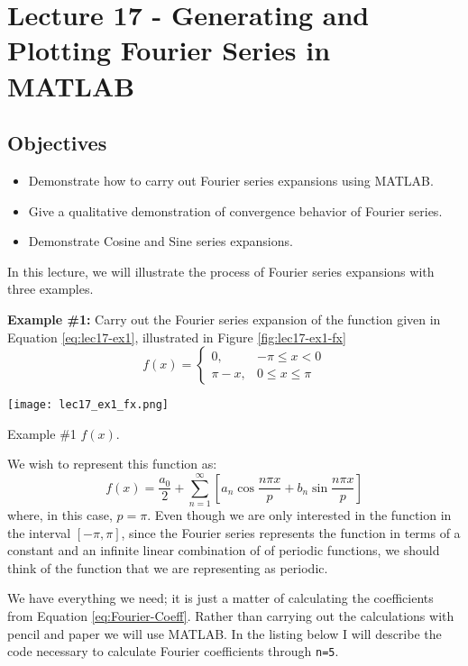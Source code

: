 \chapter{Lecture 17 - Generating and Plotting Fourier Series in MATLAB}
\label{ch:lec17}
\section{Objectives}
\begin{itemize}
\item Demonstrate how to carry out Fourier series expansions using MATLAB.
\item Give a qualitative demonstration of convergence behavior of Fourier series.
\item Demonstrate Cosine and Sine series expansions.
\end{itemize}
In this lecture, we will illustrate the process of Fourier series expansions with three examples.

\vspace{0.5cm}

\noindent\textbf{Example \#1:}
Carry out the Fourier series expansion of the function given in Equation \ref{eq:lec17-ex1}, illustrated in Figure \ref{fig:lec17-ex1-fx}
\begin{equation}
f(x) = 
\begin{cases}
0, & -\pi \le x < 0 \\
\pi - x, & 0 \le x \le \pi
\end{cases}
\label{eq:lec17-ex1}
\end{equation}
\begin{marginfigure}
\texttt{[image: lec17\_ex1\_fx.png]}
\caption{Example \#1 $f(x)$.}
\label{fig:lec17-ex1-fx}
\end{marginfigure}
We wish to represent this function as:
\begin{equation*}
f(x) = \frac{a_0}{2} + \sum\limits_{n=1}^{\infty} \left[a_n \cos{\frac{n \pi x}{p}} + b_n \sin{\frac{n \pi x}{p}} \right]
\end{equation*}
where, in this case, $p = \pi$.  Even though we are only interested in the function in the interval $[-\pi, \pi]$, since the Fourier series represents the function in terms of a constant and an infinite linear combination of of periodic functions, we should think of the function that we are representing as periodic.

We have everything we need; it is just a matter of calculating the coefficients from Equation \ref{eq:Fourier-Coeff}.  Rather than carrying out the calculations with pencil and paper we will use MATLAB.  In the listing below I will describe the code necessary to calculate Fourier coefficients through \lstinline{n=5}.

